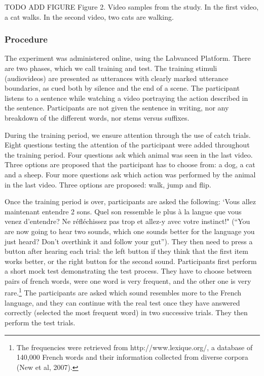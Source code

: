 \documentclass[
  american,
  ,man,floatsintext]{apa6}
\begin{document}
TODO ADD FIGURE
Figure 2. Video samples from the study. In the first video, a cat walks. In the second video, two cats are walking.

\hypertarget{procedure}{%
\subsubsection{Procedure}\label{procedure}}

The experiment was administered online, using the Labvanced Platform. There are two phases, which we call training and test. The training stimuli (audiovideos) are presented as utterances with clearly marked utterance boundaries, as cued both by silence and the end of a scene. The participant listens to a sentence while watching a video portraying the action described in the sentence. Participants are not given the sentence in writing, nor any breakdown of the different words, nor stems versus suffixes.

During the training period, we ensure attention through the use of catch trials. Eight questions testing the attention of the participant were added throughout the training period. Four questions ask which animal was seen in the last video. Three options are proposed that the participant has to choose from: a dog, a cat and a sheep. Four more questions ask which action was performed by the animal in the last video. Three options are proposed: walk, jump and flip.

Once the training period is over, participants are asked the following: `Vous allez maintenant entendre 2 sons. Quel son ressemble le plus à la langue que vous venez d'entendre? Ne réfléchissez pas trop et allez-y avec votre instinct!" (``You are now going to hear two sounds, which one sounds better for the language you just heard? Don't overthink it and follow your gut''). They then need to press a button after hearing each trial: the left button if they think that the first item works better, or the right button for the second sound. Participants first perform a short mock test demonstrating the test process. They have to choose between pairs of french words, were one word is very frequent, and the other one is very rare.\footnote{The frequencies were retrieved from http://www.lexique.org/, a database of 140,000 French words and their information collected from diverse corpora (New et al, 2007).} The participants are asked which sound resembles more to the French language, and they can continue with the real test once they have answered correctly (selected the most frequent word) in two successive trials. They then perform the test trials.
\end{document}
